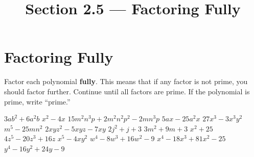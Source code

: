 

\title{Section 2.5 --- Factoring Fully}


\maketitle
\section*{Factoring Fully}
Factor each polynomial \textbf{fully}.  This means that if any factor is not prime, you should factor further.  Continue until all factors are prime.  If the polynomial is prime, write ``prime.''
\begin{smenum}
\mitemxxx
{$3ab^2+6a^2b$}
{$x^2-4x$}
{$15m^2n^3p+2m^2n^2p^2-2mn^3p$}
\mitemxxx
{$5ax-25a^2x$}
{$27x^3-3x^3y^2$}
{$m^5-25mn^2$}
\mitemxxx
{$2xyz^2-5xyz-7xy$}
{$2j^2+j+3$}
{$3m^2+9m+3$}
\mitemxxx
{$x^2+25$}
{$4z^5-20z^3+16z$}
{$x^5-4xy^2$}
\mitemxxx
{$w^4-8w^3+16w^2-9$}
{$x^4-18x^3+81x^2-25$}
{$y^4-16y^2+24y-9$}
\end{smenum}

